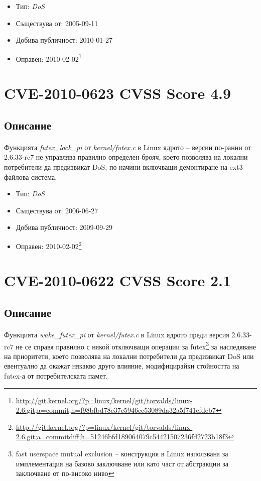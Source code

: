 \documentclass[a4paper,12pt,leqno]{article}
\begin{document}
\begin{itemize}
    \item Тип: \textit{DoS}
    \item Съществува от: 2005-09-11
  	\item Добива публичност: 2010-01-27
    \item Оправен: 2010-02-02\footnote{\url{http://git.kernel.org/?p=linux/kernel/git/torvalds/linux-2.6.git;a=commit;h=f98bfbd78c37c5946cc53089da32a5f741efdeb7}}
\end{itemize}


\section{CVE-2010-0623 CVSS Score 4.9}
\subsection{Описание}
\paragraph{}
Функцията \textit{futex\_lock\_pi} от \textit{kernel/futex.c} в Linux ядрото – версии по-ранни от 
2.6.33-rc7 не управлява правилно определен брояч, което позволява на 
локални потребители да предизвикат DoS, по начини включващи демонтиране на ext3 файлова система.

\begin{itemize}
    \item Тип: \textit{DoS}
    \item Съществува от: 2006-06-27
  	\item Добива публичност: 2009-09-29
    \item Оправен: 2010-02-02\footnote{\url{http://git.kernel.org/?p=linux/kernel/git/torvalds/linux-2.6.git;a=commitdiff;h=51246bfd189064079c54421507236fd2723b18f3}}
\end{itemize}

\section{CVE-2010-0622 CVSS Score 2.1}
\subsection{Описание}
\paragraph{}
Функцията \textit{wake\_futex\_pi} от \textit{kernel/futex.c} в Linux ядрото преди версия 2.6.33-
rc7 не се справя правилно с някой отключващи операции за futex\footnote{fast userspace mutual exclusion – конструкция в Linux използвана за имплементация на базово 
заключване или като част от абстракции за заключване от по-високо ниво}
 за наследяване на приоритети, което позволява на локални потребители да 
предизвикат DoS или евентуално да окажат някакво друго влияние, 
модифицирайки стойността на futex-а от потребителската памет.
\end{document}
